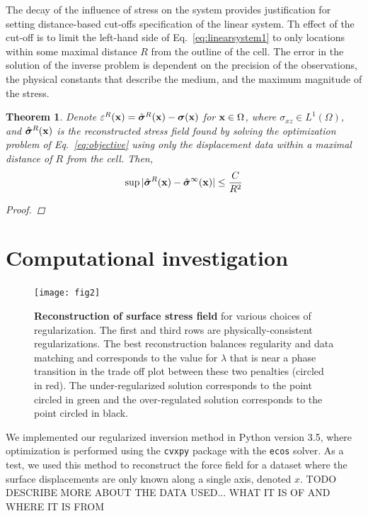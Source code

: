\documentclass[aps,prl,reprint,twocolumn,groupedaddress,showpacs]{revtex4-1}
\newtheorem{thm}{Theorem}%
\newcommand{\bsigma}{{\boldsymbol\sigma}}
\def\x{{\bf x}}
\begin{document}
The decay of the influence of stress on the system provides justification for setting distance-based
cut-offs specification of the linear system. Th effect of the cut-off is to limit the left-hand side of Eq.~\ref{eq:linearsystem1} to only locations within some maximal distance $R$ from the outline of the cell.
The error in the solution of the inverse problem is dependent on the precision of the observations,
 the physical constants that describe the medium, and the maximum magnitude of the stress.

\begin{thm}
\label{thm:main}
Denote $\varepsilon^R(\x) = \hat{\bsigma}^R(\x) - \bsigma(\x)$ for $\x\in\Omega$, where $\sigma_{xz}\in L^1(\Omega)$, and $\hat{\bsigma}^R(\x)$ is the reconstructed stress field found by solving the optimization problem of Eq.~\ref{eq:objective} using only the displacement data within a maximal distance of $R$ from the cell. Then,
\begin{equation}
\sup \vert \hat{\bsigma}^R(\x) - \hat{\bsigma}^\infty(\x) \vert \leq \frac{C}{R^2}
\end{equation}

\begin{proof}


\end{proof}

\end{thm}


\section{Computational investigation}

\begin{figure}
\texttt{[image: fig2]}
\caption{\textbf{Reconstruction of surface stress field} for various choices of regularization. The first and third rows are physically-consistent regularizations. The best reconstruction balances regularity and data matching and corresponds to the value for $\lambda$ that is near a phase transition in the trade off plot between these two penalties (circled in red). The under-regularized solution corresponds to the point circled in green and the over-regulated solution corresponds to the point circled in black.}
\label{fig:fig2}
\end{figure}

We implemented our regularized inversion method in Python version 3.5, where optimization is performed using the \texttt{cvxpy} package with the \texttt{ecos} solver. As a test, we used this method to reconstruct the force field for a dataset where the surface displacements are only known along a single axis, denoted $x$. TODO DESCRIBE MORE ABOUT THE DATA USED... WHAT IT IS OF AND WHERE IT IS FROM
\end{document}
